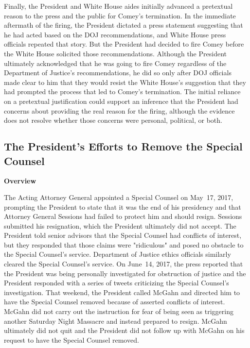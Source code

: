 Finally, the President and White House aides initially advanced a pretextual reason to the press and the public for Comey's termination.
In the immediate aftermath of the firing, the President dictated a press statement suggesting that he had acted based on the DOJ recommendations, and White House press officials repeated that story.
But the President had decided to fire Comey before the White House solicited those recommendations.
Although the President ultimately acknowledged that he was going to fire Comey regardless of the Department of Justice's recommendations, he did so only after DOJ officials made clear to him that they would resist the White House's suggestion that they had prompted the process that led to Comey's termination.
The initial reliance on a pretextual justification could support an inference that the President had concerns about providing the real reason for the firing, although the evidence does not resolve whether those concerns were personal, political, or both.

\subsection{The President's Efforts to Remove the Special Counsel}

\begin{center}
\textbf{Overview}
\end{center}

The Acting Attorney General appointed a Special Counsel on May~17, 2017, prompting the President to state that it was the end of his presidency and that Attorney General Sessions had failed to protect him and should resign.
Sessions submitted his resignation, which the President ultimately did not accept.
The President told senior advisors that the Special Counsel had conflicts of interest, but they responded that those claims were "ridiculous" and posed no obstacle to the Special Counsel's service.
Department of Justice ethics officials similarly cleared the Special Counsel's service.
On June~14, 2017, the press reported that the President was being personally investigated for obstruction of justice and the President responded with a series of tweets criticizing the Special Counsel's investigation.
That weekend, the President called McGahn and directed him to have the Special Counsel removed because of asserted conflicts of interest.
McGahn did not carry out the instruction for fear of being seen as triggering another Saturday Night Massacre and instead prepared to resign.
McGahn ultimately did not quit and the President did not follow up with McGahn on his request to have the Special Counsel removed.

